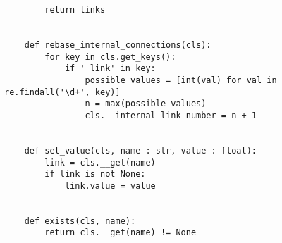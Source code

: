 {\begin{lstlisting}
        return links
    
    
    def rebase_internal_connections(cls):
        for key in cls.get_keys():
            if '_link' in key:
                possible_values = [int(val) for val in re.findall('\d+', key)]
                n = max(possible_values)
                cls.__internal_link_number = n + 1
    
    
    def set_value(cls, name : str, value : float):
        link = cls.__get(name)
        if link is not None:
            link.value = value
    
    
    def exists(cls, name):
        return cls.__get(name) != None
\end{lstlisting}

}